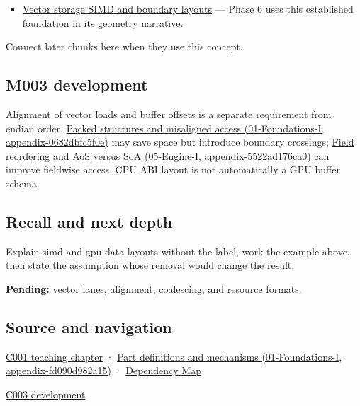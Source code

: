 \begin{itemize}
\tightlist
\item
  \hyperref[appendix-26bf6bf2fb8b]{Vector storage SIMD and boundary layouts} --- Phase 6 uses this established foundation in its geometry narrative.
\end{itemize}

Connect later chunks here when they use this concept.

\subsection{M003 development}\label{appendix-3c7b1a56de01-m003-development}

Alignment of vector loads and buffer offsets is a separate requirement from endian order. \href{../01-Foundations-I/main.pdf\#nameddest=appendix-0682dbfc5f0e}{Packed structures and misaligned access (01-Foundations-I, appendix-0682dbfc5f0e)} may save space but introduce boundary crossings; \href{../05-Engine-I/main.pdf\#nameddest=appendix-5522ad176ca0}{Field reordering and AoS versus SoA (05-Engine-I, appendix-5522ad176ca0)} can improve fieldwise access. CPU ABI layout is not automatically a GPU buffer schema.

\subsection{Recall and next depth}\label{appendix-3c7b1a56de01-recall-and-next-depth}

Explain simd and gpu data layouts without the label, work the example above, then state the assumption whose removal would change the result.

\textbf{Pending:} vector lanes, alignment, coalescing, and resource formats.

\subsection{Source and navigation}\label{appendix-3c7b1a56de01-source-and-navigation}

\href{Continuous\%20Notes/Computing\%20Foundations\%20-\%20From\%20Bits\%20to\%20C++\%20and\%20Systems\%20APIs\#From\%20a\%20signal\%20to\%20an\%20interpretation}{C001 teaching chapter} · \href{../01-Foundations-I/main.pdf\#nameddest=appendix-fd090d982a15}{Part definitions and mechanisms (01-Foundations-I, appendix-fd090d982a15)} · \hyperref[appendix-4ad47bdd269a]{Dependency Map}

\href{Continuous\%20Notes/Computing\%20Foundations\%20-\%20From\%20Bits\%20to\%20C++\%20and\%20Systems\%20APIs\#Where\%20the\%20bytes\%20live}{C003 development}
